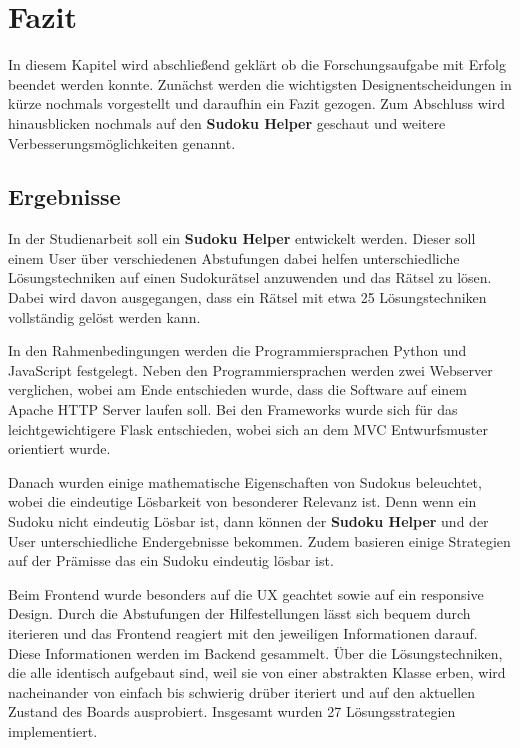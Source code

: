 
\chapter{Fazit}

In diesem Kapitel wird abschließend geklärt ob die Forschungsaufgabe mit Erfolg beendet werden konnte. Zunächst werden die wichtigsten Designentscheidungen in kürze nochmals vorgestellt und daraufhin ein Fazit gezogen. Zum Abschluss wird hinausblicken nochmals auf den \textbf{Sudoku Helper} geschaut und weitere Verbesserungsmöglichkeiten genannt. 

\section{Ergebnisse}

In der Studienarbeit soll ein \textbf{Sudoku Helper} entwickelt werden. Dieser soll einem User über verschiedenen Abstufungen dabei helfen unterschiedliche Lösungstechniken auf einen Sudokurätsel anzuwenden und das Rätsel zu lösen. Dabei wird davon ausgegangen, dass ein Rätsel mit etwa 25 Lösungstechniken vollständig gelöst werden kann. 

In den Rahmenbedingungen werden die Programmiersprachen Python und JavaScript festgelegt. Neben den Programmiersprachen werden zwei Webserver verglichen, wobei am Ende entschieden wurde, dass die Software auf einem Apache \Ac{HTTP} Server laufen soll. Bei den Frameworks wurde sich für das leichtgewichtigere Flask entschieden, wobei sich an dem \ac{MVC} Entwurfsmuster orientiert wurde.

Danach wurden einige mathematische Eigenschaften von Sudokus beleuchtet, wobei die eindeutige Lösbarkeit von besonderer Relevanz ist. Denn wenn ein Sudoku nicht eindeutig Lösbar ist, dann können der \textbf{Sudoku Helper} und der User unterschiedliche Endergebnisse bekommen. Zudem basieren einige Strategien auf der Prämisse das ein Sudoku eindeutig lösbar ist.

Beim Frontend wurde besonders auf die \ac{UX} geachtet sowie auf ein responsive Design. Durch die Abstufungen der Hilfestellungen lässt sich bequem durch iterieren und das Frontend reagiert mit den jeweiligen Informationen darauf. Diese Informationen werden im Backend gesammelt. Über die Lösungstechniken, die alle identisch aufgebaut sind, weil sie von einer abstrakten Klasse erben, wird nacheinander von einfach bis schwierig drüber iteriert und auf den aktuellen Zustand des Boards ausprobiert. Insgesamt wurden 27 Lösungsstrategien implementiert.

